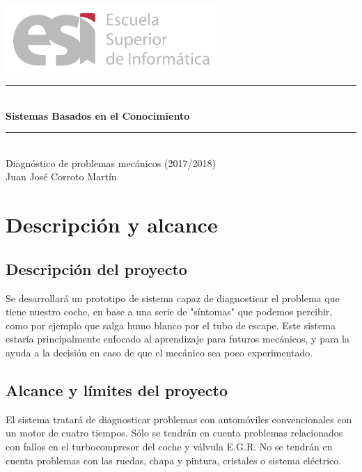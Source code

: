 \documentclass[a4paper,12pt]{article}
\begin{document}
\begin{titlepage}
\begin{center}

\includegraphics[width=0.6\textwidth]{logoesi}\\[5cm]

\rule{\linewidth}{0.5mm} \\[0.4cm]
{ \huge \bfseries Sistemas Basados en el Conocimiento\\[0.4cm] }
\rule{\linewidth}{0.5mm} \\[1.5cm]
{\huge Diagnóstico de problemas mecánicos (2017/2018)}\\[0.5cm]

\large{Juan Jos\'e Corroto Mart\'in}

\end{center}
\end{titlepage}

\tableofcontents
\newpage

\section{Descripción y alcance}
\subsection{Descripción del proyecto}
Se desarrollará un prototipo de sistema capaz de diagnosticar el problema que tiene nuestro coche, en base a una serie de "síntomas" que podemos percibir, como por ejemplo que salga humo blanco por el tubo de escape. Este sistema estaría principalmente enfocado al aprendizaje para futuros mecánicos, y para la ayuda a la decisión en caso de que el mecánico sea poco experimentado.

\subsection{Alcance y límites del proyecto}
El sistema tratará de diagnosticar problemas con automóviles convencionales con un motor de cuatro tiempos. Sólo se tendrán en cuenta problemas relacionados con fallos en el turbocompresor del coche y válvula E.G.R. No se tendrán en cuenta problemas con las ruedas, chapa y pintura, cristales o sistema eléctrico.
\end{document}
